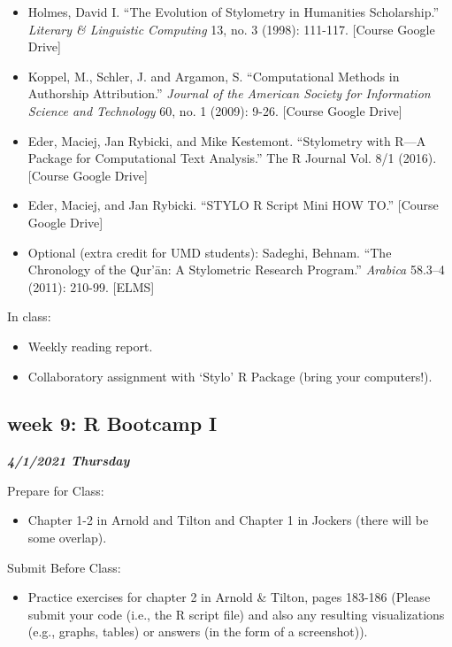 \documentclass[
]{book}
\providecommand{\tightlist}{%
  \setlength{\itemsep}{0pt}\setlength{\parskip}{0pt}}
\begin{document}
\begin{itemize}
\tightlist
\item
  Holmes, David I. ``The Evolution of Stylometry in Humanities Scholarship.'' \emph{Literary \& Linguistic Computing} 13, no. 3 (1998): 111-117. {[}Course Google Drive{]}
\item
  Koppel, M., Schler, J. and Argamon, S. ``Computational Methods in Authorship Attribution.'' \emph{Journal of the American Society for Information Science and Technology} 60, no. 1 (2009): 9-26. {[}Course Google Drive{]}
\item
  Eder, Maciej, Jan Rybicki, and Mike Kestemont. ``Stylometry with R---A Package for Computational Text Analysis.'' The R Journal Vol. 8/1 (2016). {[}Course Google Drive{]}\\
\item
  Eder, Maciej, and Jan Rybicki. ``STYLO R Script Mini HOW TO.'' {[}Course Google Drive{]}
\item
  Optional (extra credit for UMD students): Sadeghi, Behnam. ``The Chronology of the Qur'ān: A Stylometric Research Program.'' \emph{Arabica} 58.3--4 (2011): 210-99. {[}ELMS{]}
\end{itemize}

In class:

\begin{itemize}
\tightlist
\item
  Weekly reading report.
\item
  Collaboratory assignment with `Stylo' R Package (bring your computers!).
\end{itemize}

\hypertarget{week-9-r-bootcamp-i}{%
\subsection{week 9: R Bootcamp I}\label{week-9-r-bootcamp-i}}

\textbf{\emph{4/1/2021 Thursday}}

Prepare for Class:

\begin{itemize}
\tightlist
\item
  Chapter 1-2 in Arnold and Tilton and Chapter 1 in Jockers (there will be some overlap).
\end{itemize}

Submit Before Class:

\begin{itemize}
\tightlist
\item
  Practice exercises for chapter 2 in Arnold \& Tilton, pages 183-186 (Please submit your code (i.e., the R script file) and also any resulting visualizations (e.g., graphs, tables) or answers (in the form of a screenshot)).
\end{itemize}
\end{document}
